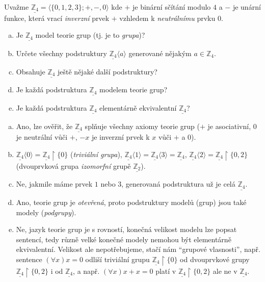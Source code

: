 \begin{problem}

    Uvažme $\underline{\mathbb Z_4}=\langle\{0,1,2,3\};+,-,0 \rangle$ kde $+$ je binární sčítání modulo $4$ a $-$ je unární funkce, která vrací \emph{inverzní} prvek $+$ vzhledem k \emph{neutrálnímu} prvku $0$.
    \begin{enumerate}[(a)]      
        \item Je $\underline{\mathbb Z_4}$ model teorie grup (tj. je to \emph{grupa})?
        \item Určete všechny podstruktury $\underline{\mathbb Z_4}\langle a\rangle$ generované nějakým $a\in \mathbb Z_4$.
        \item Obsahuje $\underline{\mathbb Z_4}$ ještě nějaké další podstruktury?
        \item Je každá podstruktura $\underline{\mathbb Z_4}$ modelem teorie grup?
        \item Je každá podstruktura $\underline{\mathbb Z_4}$ elementárně ekvivalentní $\underline{\mathbb Z_4}$?
    \end{enumerate}

    \begin{solution}

        \begin{enumerate}[(a)]
            \item Ano, lze ověřit, že $\underline{\mathbb Z_4}$ splňuje všechny axiomy teorie grup ($+$ je asociativní, $0$ je neutrální vůči $+$, $-x$ je inverzní prvek k $x$ vůči $+$ a $0$).
            \item $\underline{\mathbb Z_4}\langle 0\rangle=\underline{\mathbb Z_4}\restriction\{0\}$ (\emph{triviální grupa}), $\underline{\mathbb Z_4}\langle 1\rangle=\underline{\mathbb Z_4}\langle 3\rangle=\underline{\mathbb Z_4}$, $\underline{\mathbb Z_4}\langle 2\rangle=\underline{\mathbb Z_4}\restriction\{0,2\}$ (dvouprvková grupa \emph{izomorfní} grupě $\underline{\mathbb Z_2}$).
            \item Ne, jakmile máme prvek $1$ nebo $3$, generovaná podstruktura už je celá $\underline{\mathbb Z_4}$.
            \item Ano, teorie grup je \emph{otevřená}, proto podstruktury modelů (grup) jsou také modely (\emph{podgrupy}).
            \item Ne, jazyk teorie grup je s rovností, konečná velikost modelu lze popsat sentencí, tedy různě velké konečné modely nemohou být elementárně ekvivalentní. Velikost ale nepotřebujeme, stačí nám ``grupové vlasnosti'', např. sentence $(\forall x)x=0$ odliší triviální grupu $\underline{\mathbb Z_4}\restriction\{0\}$ od dvouprvkové grupy $\underline{\mathbb Z_4}\restriction\{0,2\}$ i od $\underline{\mathbb Z_4}$, a např. $(\forall x)x+x=0$ platí v $\underline{\mathbb Z_4}\restriction\{0,2\}$ ale ne v $\underline{\mathbb Z_4}$.
        \end{enumerate}
                    
    \end{solution}

\end{problem}


